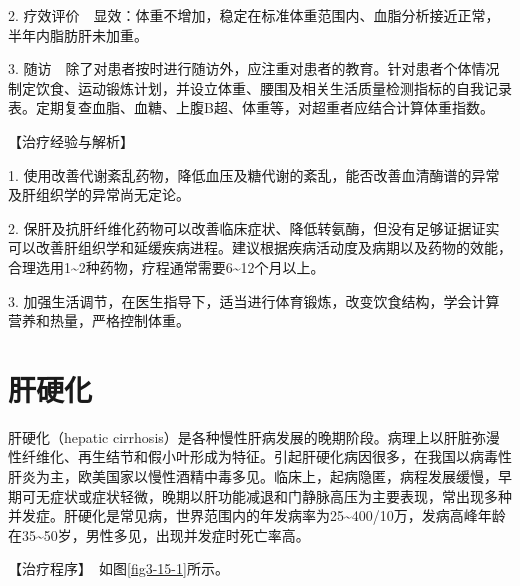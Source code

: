 2.
疗效评价　显效：体重不增加，稳定在标准体重范围内、血脂分析接近正常，半年内脂肪肝未加重。

3.
随访　除了对患者按时进行随访外，应注重对患者的教育。针对患者个体情况制定饮食、运动锻炼计划，并设立体重、腰围及相关生活质量检测指标的自我记录表。定期复查血脂、血糖、上腹B超、体重等，对超重者应结合计算体重指数。

【治疗经验与解析】

1.
使用改善代谢紊乱药物，降低血压及糖代谢的紊乱，能否改善血清酶谱的异常及肝组织学的异常尚无定论。

2.
保肝及抗肝纤维化药物可以改善临床症状、降低转氨酶，但没有足够证据证实可以改善肝组织学和延缓疾病进程。建议根据疾病活动度及病期以及药物的效能，合理选用1\textasciitilde{}2种药物，疗程通常需要6\textasciitilde{}12个月以上。

3.
加强生活调节，在医生指导下，适当进行体育锻炼，改变饮食结构，学会计算营养和热量，严格控制体重。

\section{肝硬化}

肝硬化（hepatic
cirrhosis）是各种慢性肝病发展的晚期阶段。病理上以肝脏弥漫性纤维化、再生结节和假小叶形成为特征。引起肝硬化病因很多，在我国以病毒性肝炎为主，欧美国家以慢性酒精中毒多见。临床上，起病隐匿，病程发展缓慢，早期可无症状或症状轻微，晚期以肝功能减退和门静脉高压为主要表现，常出现多种并发症。肝硬化是常见病，世界范围内的年发病率为25\textasciitilde{}400/10万，发病高峰年龄在35\textasciitilde{}50岁，男性多见，出现并发症时死亡率高。

【治疗程序】　如图\ref{fig3-15-1}所示。

